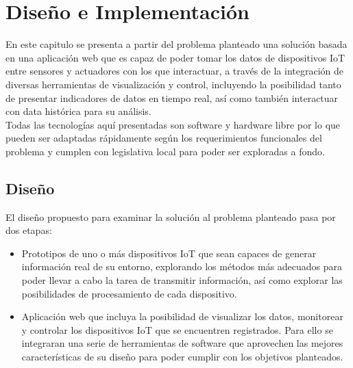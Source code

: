 

\chapter{Diseño e Implementación}
En este capitulo se presenta a partir del problema planteado una solución basada en una aplicación web que es capaz de poder tomar los datos de dispositivos IoT entre sensores y actuadores con los que interactuar, a través de la integración de diversas herramientas de visualización y control, incluyendo la posibilidad tanto de presentar indicadores de datos en tiempo real, así como también interactuar con data histórica para su análisis.\\

Todas las tecnologías aquí presentadas son software y hardware libre por lo que pueden ser adaptadas rápidamente según los requerimientos funcionales del problema y cumplen con legislativa local para poder ser exploradas a fondo. 

\section{Diseño}
El diseño propuesto para examinar la solución al problema planteado pasa por dos etapas:
\begin{itemize}
\item Prototipos de uno o más dispositivos IoT que sean capaces de generar información real de su entorno, explorando los métodos más adecuados para poder llevar a cabo la tarea de transmitir información, así como explorar las posibilidades de procesamiento de cada dispositivo.
\item Aplicación web que incluya la posibilidad de visualizar los datos, monitorear y controlar los dispositivos IoT que se encuentren registrados. Para ello se integraran una serie de herramientas de software que aprovechen las mejores características de su diseño para poder cumplir con los objetivos planteados.
\end{itemize}

